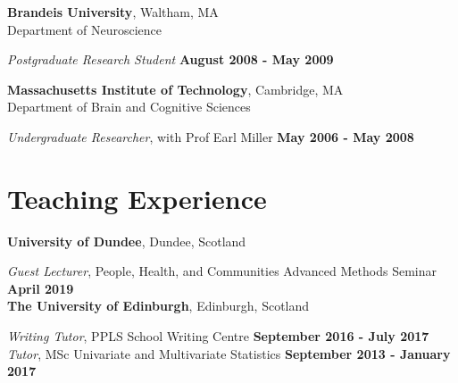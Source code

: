 \documentclass[margin,line]{res}
\begin{document}
\begin{resume}
\vspace{-.1cm}

{\bf Brandeis University}, Waltham, MA \\
Department of Neuroscience

\vspace{-.2cm}
{\em Postgraduate Research Student} \hfill {\bf August 2008 - May 2009}\\
\vspace{-.3cm}


\vspace{-.1cm}

{\bf Massachusetts Institute of Technology}, Cambridge, MA \\
Department of Brain and Cognitive Sciences

\vspace{-.2cm}
{\em Undergraduate Researcher}, with Prof Earl Miller \hfill {\bf May 2006 - May 2008}\\
\vspace{-.3cm}




\section{\sc Teaching Experience}

{\bf University of Dundee}, Dundee, Scotland

\vspace{-.3cm}

\vspace{.1cm}
{\em Guest Lecturer}, People, Health, and Communities Advanced Methods Seminar  \hfill {\bf April 2019}\\


{\bf  The University of Edinburgh}, Edinburgh, Scotland

\vspace{-.3cm}

\vspace{.1cm}
{\em Writing Tutor}, PPLS School Writing Centre \hfill {\bf September 2016 - July 2017}\\

\vspace{-.4cm}
{\em Tutor}, MSc Univariate and Multivariate Statistics \hfill {\bf September 2013 - January 2017}\\


\end{resume}
\end{document}
